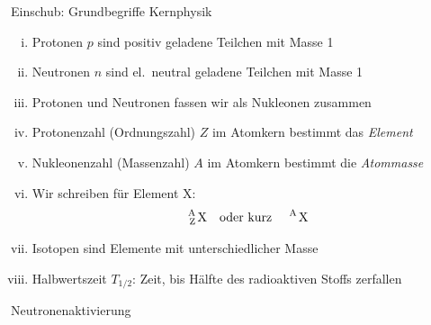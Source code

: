 \documentclass[xcolor=x11names, aspectratio=169]{beamer}
\begin{document}
\begin{frame}{Einschub: Grundbegriffe Kernphysik}
\begin{enumerate}[(i)]
\item \alert{Protonen} $p$ sind positiv geladene Teilchen mit Masse 1
\item \alert{Neutronen} $n$ sind el.\ neutral geladene Teilchen mit Masse 1
\item Protonen und Neutronen fassen wir als \alert{Nukleonen} zusammen\pause
\item Protonenzahl (\alert{Ordnungszahl}) $Z$ im Atomkern bestimmt das \emph{Element}
\item Nukleonenzahl (\alert{Massenzahl}) $A$ im Atomkern bestimmt die \emph{Atommasse}\pause
\item Wir schreiben für Element X: \[\text{\ce{^A_Z X}\quad oder kurz \quad\ce{^A X}}\]\pause\vspace*{-1.5em}
\item \alert{Isotopen} sind Elemente mit unterschiedlicher Masse
\item \alert{Halbwertszeit} $T_{1/2}$: Zeit, bis Hälfte des radioaktiven Stoffs zerfallen
\end{enumerate}
\end{frame}

\begin{frame}{Neutronenaktivierung}
\begin{center}\vspace*{-2.5em}
\end{center}
\end{frame}
\end{document}
